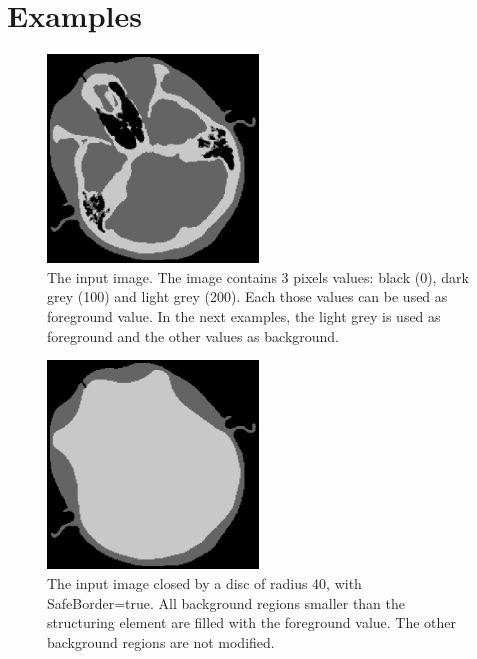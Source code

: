 \documentclass[IJ]{cesj}
\begin{document}
\section{Examples}

\begin{figure}[b]
\centering
\includegraphics[width=0.5\textwidth]{2th_cthead1.eps}
\caption{The input image. The image contains 3 pixels values: black (0), dark grey (100) and light grey (200). Each those values can be used as foreground value. In the next examples, the light grey is used as foreground and the other values as background.}
\end{figure}

\begin{figure}
\centering
\includegraphics[width=0.5\textwidth]{close.eps}
\caption{The input image closed by a disc of radius 40, with SafeBorder=true. All background regions smaller than the structuring element are filled with the foreground value. The other background regions are not modified.}
\end{figure}
\end{document}
